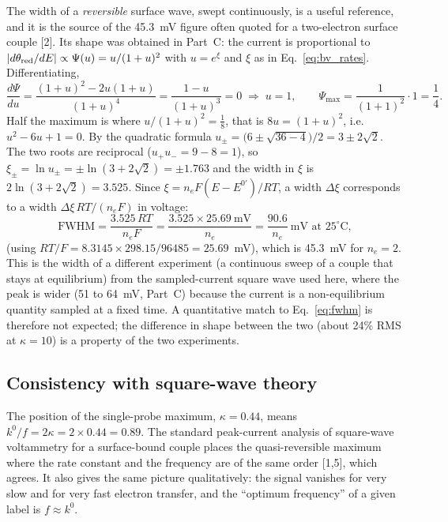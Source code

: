 \documentclass[10pt,a4paper]{article}
\numberwithin{equation}{section}
\newcommand{\cit}[1]{[#1]}
\newcommand{\kzero}{k^0}
\newcommand{\Eform}{E^{0\prime}}
\newcommand{\fwhmMaxK}{64}
\newcommand{\fwhmMin}{51}
\newcommand{\kappaMax}{0.44}
\begin{document}
The width of a \emph{reversible} surface wave, swept continuously, is a useful reference, and it is
the source of the 45.3~mV figure often quoted for a two-electron surface couple \cit{2}. Its shape
was obtained in Part~C: the current is proportional to $|d\theta_{\rm red}/dE|\propto\Psi(u)=u/(1+u)^2$ with $u=e^{\xi}$ and
$\xi$ as in Eq.~\eqref{eq:bv_rates}. Differentiating,
\[
  \frac{d\Psi}{du}=\frac{(1+u)^2-2u(1+u)}{(1+u)^4}=\frac{1-u}{(1+u)^3}=0\;\Rightarrow\;u=1,\qquad
  \Psi_{\max}=\frac{1}{(1+1)^2}\cdot1=\frac14 .
\]
Half the maximum is where $u/(1+u)^2=\tfrac18$, that is $8u=(1+u)^2$, i.e.\ $u^2-6u+1=0$. By the quadratic formula
$u_\pm=\bigl(6\pm\sqrt{36-4}\bigr)/2=3\pm2\sqrt2$. The two roots are reciprocal ($u_+u_-=9-8=1$), so
$\xi_\pm=\ln u_\pm=\pm\ln(3+2\sqrt2)=\pm1.763$ and the width in $\xi$ is $2\ln(3+2\sqrt2)=3.525$. Since
$\xi=n_eF(E-\Eform)/RT$, a width $\Delta\xi$ corresponds to a width $\Delta\xi\,RT/(n_eF)$ in voltage:
\begin{equation}
  \mathrm{FWHM}=\frac{3.525\,RT}{n_eF}=\frac{3.525\times25.69~\text{mV}}{n_e}=\frac{90.6}{n_e}~\text{mV at }25^\circ\text{C},
  \label{eq:fwhm}
\end{equation}
(using $RT/F=8.3145\times298.15/96485=25.69$~mV), which is 45.3~mV for $n_e=2$. This is the width of a different experiment (a continuous sweep of a couple that
stays at equilibrium) from the sampled-current square wave used here, where the peak is wider
(\fwhmMin{} to \fwhmMaxK~mV, Part~C) because the current is a non-equilibrium quantity sampled
at a fixed time. A quantitative match to Eq.~\eqref{eq:fwhm} is therefore not expected; the difference in shape between the two
(about 24\% RMS at $\kappa=10$) is a property of the two experiments.

\subsection{Consistency with square-wave theory}
\label{sec:valid-theory}

The position of the single-probe maximum, $\kappa=\kappaMax$, means $\kzero/f=2\kappa=2\times\kappaMax=0.89$. The
standard peak-current analysis of square-wave voltammetry for a surface-bound couple places the
quasi-reversible maximum where the rate constant and the frequency are of the same order \cit{1,5}, which agrees. It
also gives the same picture qualitatively: the signal vanishes for very slow and for very fast
electron transfer, and the ``optimum frequency'' of a given label is $f\approx\kzero$.
\end{document}
